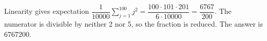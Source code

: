Linearity gives expectation $\dfrac{1}{10000}\sum_{j=1}^{100}j^2=\dfrac{100\cdot101\cdot201}{6\cdot10000}=\dfrac{6767}{200}$. The numerator is divisible by neither 2 nor 5, so the fraction is reduced. The answer is $\boxed{6767200}$.
